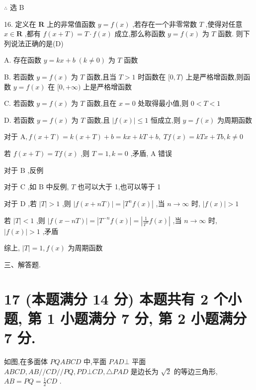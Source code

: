 \documentclass[10pt]{article}
\begin{document}
\(\therefore\) 选 B

16. 定义在 \(\mathbf{R}\) 上的非常值函数 \(y = f\left( x\right)\) ,若存在一个非零常数 \(T\) ,使得对任意 \(x \in  \mathbf{R}\) ,都有 \(f\left( {x + T}\right)  = T \cdot  f\left( x\right)\) 成立,那么称函数 \(y = f\left( x\right)\) 为 \(T\) 函数. 则下列说法正确的是(D)

A. 存在函数 \(y = {kx} + b\;\left( {k \neq  0}\right)\) 为 \(T\) 函数

B. 若函数 \(y = f\left( x\right)\) 为 \(T\) 函数,且当 \(T > 1\) 时函数在 \(\lbrack 0,T)\) 上是严格增函数,则函数 \(y = f\left( x\right)\) 在 \(\lbrack 0, + \infty )\) 上是严格增函数

C. 若函数 \(y = f\left( x\right)\) 为 \(T\) 函数,且在 \(x = 0\) 处取得最小值,则 \(0 < T < 1\)

D. 若函数 \(y = f\left( x\right)\) 为 \(T\) 函数,且 \(\left| {f\left( x\right) }\right|  \leq  1\) 恒成立,则 \(y = f\left( x\right)\) 为周期函数

对于 \(\mathrm{A},f\left( {x + T}\right)  = k\left( {x + T}\right)  + b = {kx} + {kT} + b,\;{Tf}\left( x\right)  = {kTx} + {Tb},k \neq  0\)

若 \(f\left( {x + T}\right)  = {Tf}\left( x\right)\) ,则 \(T = 1,k = 0\) ,矛盾, \(\mathrm{A}\) 错误

对于 \(\mathrm{B}\) ,反例

对于 \(\mathrm{C}\) ,如 \(\mathrm{B}\) 中反例, \(T\) 也可以大于 1,也可以等于 1

对于 \(\mathrm{D}\) ,若 \(\left| T\right|  > 1\) ,则 \(\left| {f\left( {x + {nT}}\right) }\right|  = \left| {{T}^{n}f\left( x\right) }\right|\) ,当 \(n \rightarrow  \infty\) 时, \(\left| {f\left( x\right) }\right|  > 1\)

若 \(\left| T\right|  < 1\) ,则 \(\left| {f\left( {x - {nT}}\right) }\right|  = \left| {{T}^{-n}f\left( x\right) }\right|  = \left| {\frac{1}{{T}^{n}}f\left( x\right) }\right|\) ,当 \(n \rightarrow  \infty\) 时, \(\left| {f\left( x\right) }\right|  > 1\) ,矛盾

综上, \(\left| T\right|  = 1,f\left( x\right)\) 为周期函数

三、解答题.

\section*{17 (本题满分 14 分) 本题共有 2 个小题, 第 1 小题满分 7 分, 第 2 小题满分 7 分.}

如图,在多面体 \({PQABCD}\) 中,平面 \({PAD} \bot\) 平面 \({ABCD},{AB}//{CD}//{PQ},{PD} \bot  {CD},\bigtriangleup {PAD}\) 是边长为 \(\sqrt{2}\) 的等边三角形, \({AB} = {PQ} = \frac{1}{2}{CD}\) .
\end{document}
